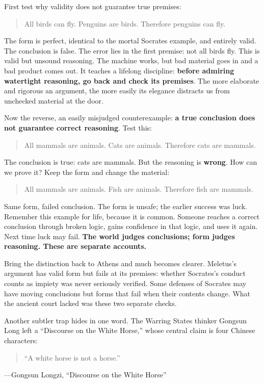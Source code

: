 First test why validity does not guarantee true premises:

\begin{quote}
All birds can fly. Penguins are birds. Therefore penguins can fly.
\end{quote}
The form is perfect, identical to the mortal Socrates example, and entirely valid. The conclusion is false. The error lies in the first premise: not all birds fly. This is valid but unsound reasoning. The machine works, but bad material goes in and a bad product comes out. It teaches a lifelong discipline: \textbf{before admiring watertight reasoning, go back and check its premises}. The more elaborate and rigorous an argument, the more easily its elegance distracts us from unchecked material at the door.

Now the reverse, an easily misjudged counterexample: \textbf{a true conclusion does not guarantee correct reasoning}. Test this:

\begin{quote}
All mammals are animals. Cats are animals. Therefore cats are mammals.
\end{quote}
The conclusion is true: cats are mammals. But the reasoning is \textbf{wrong}. How can we prove it? Keep the form and change the material:

\begin{quote}
All mammals are animals. Fish are animals. Therefore fish are mammals.
\end{quote}
Same form, failed conclusion. The form is unsafe; the earlier success was luck. Remember this example for life, because it is common. Someone reaches a correct conclusion through broken logic, gains confidence in that logic, and uses it again. Next time luck may fail. \textbf{The world judges conclusions; form judges reasoning. These are separate accounts.}

Bring the distinction back to Athens and much becomes clearer. Meletus's argument has valid form but fails at its premises: whether Socrates's conduct counts as impiety was never seriously verified. Some defenses of Socrates may have moving conclusions but forms that fail when their contents change. What the ancient court lacked was these two separate checks.

Another subtler trap hides in one word. The Warring States thinker Gongsun Long left a ``Discourse on the White Horse,'' whose central claim is four Chinese characters:

\begin{quote}
``A white horse is not a horse.''
\end{quote}
---Gongsun Longzi, ``Discourse on the White Horse''

